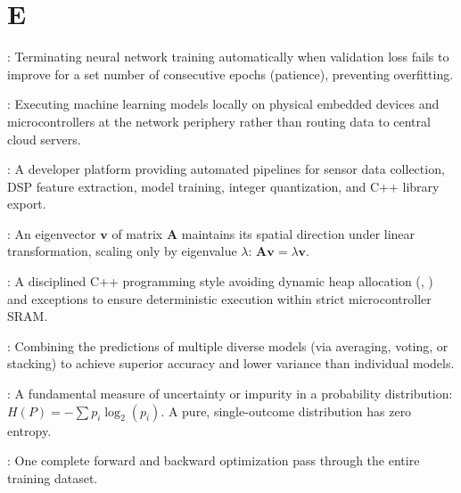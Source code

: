 \section*{E}
\begin{description}[leftmargin=!,labelwidth=4.5cm,itemsep=1.5ex]
\item[\textbf{Early Stopping}\hfill \textnormal{\sffamily\scriptsize\color{keyideablue}[Deep Learning]}]: Terminating neural network training automatically when validation loss fails to improve for a set number of consecutive epochs (patience), preventing overfitting.
\item[\textbf{Edge AI}\hfill \textnormal{\sffamily\scriptsize\color{keyideablue}[TinyML]}]: Executing machine learning models locally on physical embedded devices and microcontrollers at the network periphery rather than routing data to central cloud servers.
\item[\textbf{Edge Impulse}\hfill \textnormal{\sffamily\scriptsize\color{keyideablue}[TinyML Tools]}]: A developer platform providing automated pipelines for sensor data collection, DSP feature extraction, model training, integer quantization, and C++ library export.
\item[\textbf{Eigenvalue \& Eigenvector}\hfill \textnormal{\sffamily\scriptsize\color{keyideablue}[Mathematics]}]: An eigenvector $\mathbf{v}$ of matrix $\mathbf{A}$ maintains its spatial direction under linear transformation, scaling only by eigenvalue $\lambda$: $\mathbf{A}\mathbf{v} = \lambda \mathbf{v}$.
\item[\textbf{Embedded C++}\hfill \textnormal{\sffamily\scriptsize\color{keyideablue}[IoT \& Software]}]: A disciplined C++ programming style avoiding dynamic heap allocation (, ) and exceptions to ensure deterministic execution within strict microcontroller SRAM.
\item[\textbf{Ensemble Learning}\hfill \textnormal{\sffamily\scriptsize\color{keyideablue}[Classical ML]}]: Combining the predictions of multiple diverse models (via averaging, voting, or stacking) to achieve superior accuracy and lower variance than individual models.
\item[\textbf{Entropy}\hfill \textnormal{\sffamily\scriptsize\color{keyideablue}[Information Theory]}]: A fundamental measure of uncertainty or impurity in a probability distribution: $H(P) = -\sum p_i \log_2(p_i)$. A pure, single-outcome distribution has zero entropy.
\item[\textbf{Epoch}\hfill \textnormal{\sffamily\scriptsize\color{keyideablue}[Deep Learning]}]: One complete forward and backward optimization pass through the entire training dataset.

\end{description}
